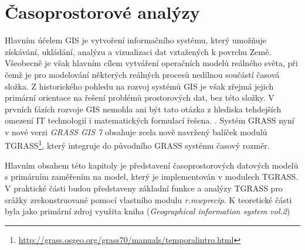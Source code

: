 \documentclass[a4paper,12pt,oneside]{report}
\begin{document}
\newpage
\setcounter{footnote}{1}
\section{Časoprostorové analýzy}
Hlavním účelem GIS je vytvoření informačního systému, který umožňuje
získávání, ukládání, analýzu a vizualizaci dat vztažených k povrchu Země.  Všeobecně je však hlavním cílem vytváření operačních modelů reálného světa, při čemž je pro modelování některých reálných procesů nedílnou součástí časová složka.  Z historického pohledu na rozvoj systémů GIS je však zřejmá jejich primární orientace na řešení problémů  prostorových dat, bez této složky. V prvních fázích rozvoje GIS nemohla ani být 
tato otázka z hlediska tehdejších omezení IT technologií i matematických
 formulací řešena. \cite{geospatialanal}. Systém GRASS nyní v nové verzi
\textit{GRASS GIS 7 } obsahuje zcela nově navržený balíček modulů
TGRASS\footnote{\url{http://grass.osgeo.org/grass70/manuals/temporalintro.html}},
který integruje do původního GRASS systému časový rozměr.

Hlavním obsahem této kapitoly je představení časoprostorových
datových modelů s primárním zaměřením na model, který je implementován
v modulech TGRASS. V praktické části budou představeny základní funkce
a analýzy TGRASS pro  srážky zrekonstruované pomocí vlastního modulu
\textit{r.mwprecip}. K teoretické části byla jako primární zdroj
využita kniha (\textit{Geographical information system vol.2})\cite{gistemporal}
\end{document}
